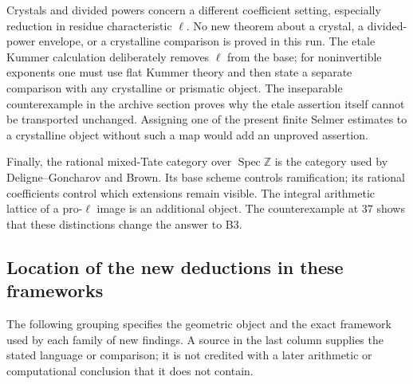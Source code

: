 \documentclass[11pt,a4paper]{article}
\theoremstyle{definition}
\begin{document}
Crystals and divided powers concern a different coefficient setting,
especially reduction in residue characteristic $\ell$. No new theorem
about a crystal, a divided-power envelope, or a crystalline comparison
is proved in this run. The etale Kummer calculation deliberately removes
$\ell$ from the base; for noninvertible exponents one must use flat
Kummer theory and then state a separate comparison with any crystalline
or prismatic object. The inseparable counterexample in the archive
section proves why the etale assertion itself cannot be transported
unchanged. Assigning one of the present finite Selmer estimates to a
crystalline object without such a map would add an unproved assertion.

Finally, the rational mixed-Tate category over $\operatorname{Spec}
\mathbb Z$ is the category used by Deligne--Goncharov and Brown. Its
base scheme controls ramification; its rational coefficients control
which extensions remain visible. The integral arithmetic lattice of a
pro-$\ell$ image is an additional object. The counterexample at $37$
shows that these distinctions change the answer to B3.

\subsection{Location of the new deductions in these frameworks}

The following grouping specifies the geometric object and the exact
framework used by each family of new findings. A source in the last
column supplies the stated language or comparison; it is not credited
with a later arithmetic or computational conclusion that it does not
contain.
\end{document}
